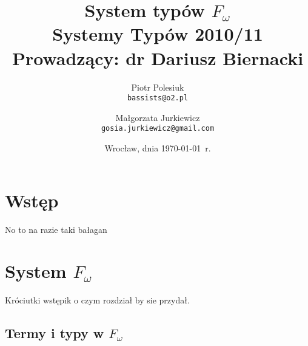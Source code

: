 \documentclass[11pt,leqno]{article}
\title{{\textbf{System typów $F_{\omega}$}}\\[1ex]
       {\Large Systemy Typów 2010/11}\\[-1ex]
       {\large Prowadzący: dr Dariusz Biernacki}}
\author{Piotr Polesiuk \\ \texttt{bassists@o2.pl} 
   \and Małgorzata Jurkiewicz \\ \texttt{gosia.jurkiewicz@gmail.com}}
\date{Wrocław, dnia \today\ r.}
\begin{document}
\thispagestyle{empty}
\maketitle

\pagebreak

\theoremstyle{plain}
\newtheorem{twierdzenie}{Twierdzenie}
\newtheorem{lemay}{Lemat}

\theoremstyle{definition}
\newtheorem{definicja}{Definicja}

\section{Wstęp}
\setcounter{equation}{0}


No to na razie taki bałagan



\section{System $F_{\omega}$}                                 
\setcounter{equation}{0}

Króciutki wstępik o czym rozdział by sie przydał.

\subsection {Termy i typy w $F_\omega$}
\end{document}
